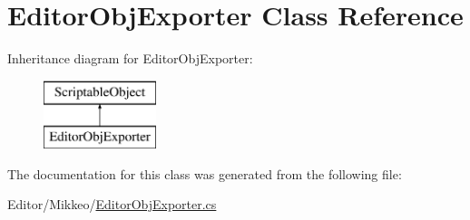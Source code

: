 \hypertarget{class_editor_obj_exporter}{}\section{Editor\+Obj\+Exporter Class Reference}
\label{class_editor_obj_exporter}
Inheritance diagram for Editor\+Obj\+Exporter\+:\begin{figure}[H]
\begin{center}
\leavevmode
\includegraphics[height=2.000000cm]{class_editor_obj_exporter}
\end{center}
\end{figure}


The documentation for this class was generated from the following file\+:\begin{DoxyCompactItemize}
\item 
Editor/\+Mikkeo/\hyperlink{_editor_obj_exporter_8cs}{Editor\+Obj\+Exporter.\+cs}\end{DoxyCompactItemize}
